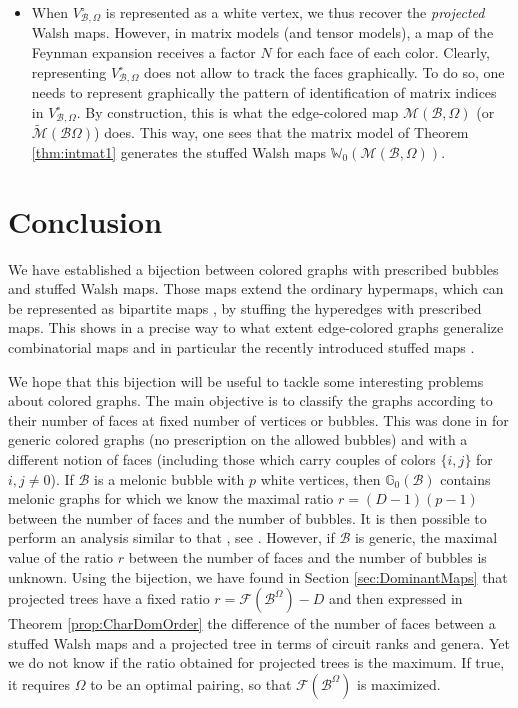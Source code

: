 \documentclass[aps,prd,10pt,notitlepage,nofootinbib,superscriptaddress,showkeys,showpacs]{revtex4-1}
\begin{document}
\begin{itemize}
\item When $V^{\circ}_{{\mathcal{B}},\Omega}$ is represented as a white vertex, we thus recover the \emph{projected} Walsh maps. However, in matrix models (and tensor models), a map of the Feynman expansion receives a factor $N$ for each face of each color. Clearly, representing $V^{\circ}_{{\mathcal{B}},\Omega}$ does not allow to track the faces graphically. To do so, one needs to represent graphically the pattern of identification of matrix indices in $V^{\circ}_{{\mathcal{B}},\Omega}$. By construction, this is what the edge-colored map ${\mathcal{M}}({\mathcal{B}}, \Omega)$ (or $\tilde{\mathcal{M}}({\mathcal{B}} \Omega)$) does. This way, one sees that the matrix model of Theorem \ref{thm:intmat1} generates the stuffed Walsh maps ${\mathbb{W}}_0({\mathcal{M}}({\mathcal{B}}, \Omega))$.
\end{itemize}

\section*{Conclusion}

We have established a bijection between colored graphs with prescribed bubbles and stuffed Walsh maps. Those maps extend the ordinary hypermaps, which can be represented as bipartite maps \cite{Walsh}, by stuffing the hyperedges with prescribed maps. This shows in a precise way to what extent edge-colored graphs generalize combinatorial maps and in particular the recently introduced stuffed maps \cite{Stuffed}.

We hope that this bijection will be useful to tackle some interesting problems about colored graphs. The main objective is to classify the graphs according to their number of faces at fixed number of vertices or bubbles. This was done in \cite{GS} for generic colored graphs (no prescription on the allowed bubbles) and with a different notion of faces (including those which carry couples of colors $\{i,j\}$ for $i,j\neq 0$). If ${\mathcal{B}}$ is a melonic bubble with $p$ white vertices, then ${\mathbb{G}}_0({\mathcal{B}})$ contains melonic graphs for which we know the maximal ratio $r = (D-1)(p-1)$ between the number of faces and the number of bubbles. It is then possible to perform an analysis similar to that \cite{GS}, see \cite{DSSD}. However, if ${\mathcal{B}}$ is generic, the maximal value of the ratio $r$ between the number of faces and the number of bubbles is unknown. Using the bijection, we have found in Section \ref{sec:DominantMaps} that projected trees have a fixed ratio $r = {\mathcal{F}}({\mathcal{B}}^\Omega) - D$ and then expressed in Theorem \ref{prop:CharDomOrder} the difference of the number of faces between a stuffed Walsh maps and a projected tree in terms of circuit ranks and genera. Yet we do not know if the ratio obtained for projected trees is the maximum. If true, it requires $\Omega$ to be an optimal pairing, so that ${\mathcal{F}}({\mathcal{B}}^\Omega)$ is maximized.
\end{document}
